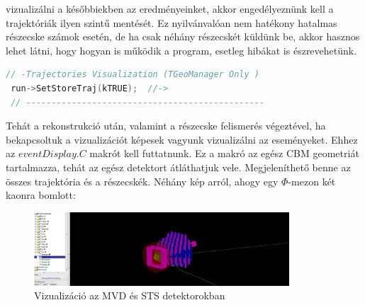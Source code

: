 \documentclass[a4paper,12pt]{article}
\begin{document}
vizualizálni a későbbiekben az eredményeinket, akkor engedélyeznünk kell a trajektóriák ilyen szintű mentését. Ez nyilvánvalóan nem 
hatékony hatalmas részecske számok esetén, de ha csak néhány részecskét küldünk be, akkor hasznos lehet látni, hogy hogyan is működik a 
program, esetleg hibákat is észrevehetünk.
\begin{lstlisting}[language=C++]
 // -Trajectories Visualization (TGeoManager Only )
 run->SetStoreTraj(kTRUE);  //->
 // -----------------------------------------------
\end{lstlisting}
\par Tehát a rekonstrukció után, valamint a részecske felismerés végeztével, ha bekapcsoltuk a vizualizációt képesek vagyunk vizualizálni az
eseményeket. Ehhez az $eventDisplay.C$ makrót kell futtatnunk. Ez a makró az egész CBM geometriát tartalmazza, tehát az egész 
detektort átláthatjuk vele. Megjeleníthető benne az összes trajektória és a részecskék. Néhány kép arról, ahogy egy $\Phi$-mezon két kaonra bomlott:
\begin{figure}[H]
	\centering
	\includegraphics[width=0.85\textwidth]{k-k+decayofphi.png}
	\caption{ Vizualizáció az MVD és STS detektorokban }
\end{figure}
\end{document}

